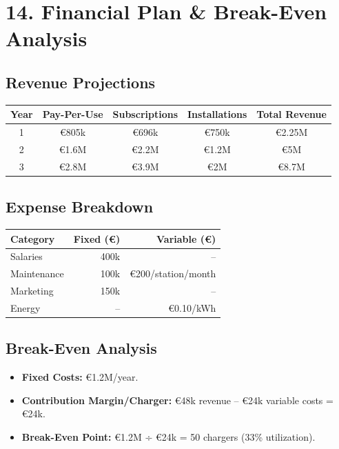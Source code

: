 \section{14. Financial Plan \& Break-Even Analysis}
\subsection{Revenue Projections}
\begin{tabular}{|c|c|c|c|c|}
\hline
\textbf{Year} & \textbf{Pay-Per-Use} & \textbf{Subscriptions} & \textbf{Installations} & \textbf{Total Revenue} \\
\hline
1 & €805k & €696k & €750k & €2.25M \\
\hline
2 & €1.6M & €2.2M & €1.2M & €5M \\
\hline
3 & €2.8M & €3.9M & €2M & €8.7M \\
\hline
\end{tabular}

\subsection{Expense Breakdown}
\begin{tabular}{|l|r|r|}
\hline
\textbf{Category} & \textbf{Fixed (€)} & \textbf{Variable (€)} \\
\hline
Salaries & 400k & – \\
\hline
Maintenance & 100k & €200/station/month \\
\hline
Marketing & 150k & – \\
\hline
Energy & – & €0.10/kWh \\
\hline
\end{tabular}

\subsection{Break-Even Analysis}
\begin{itemize}
    \item \textbf{Fixed Costs:} €1.2M/year.
    \item \textbf{Contribution Margin/Charger:} €48k revenue – €24k variable costs = €24k.
    \item \textbf{Break-Even Point:} €1.2M ÷ €24k = 50 chargers (33\% utilization).
\end{itemize}

